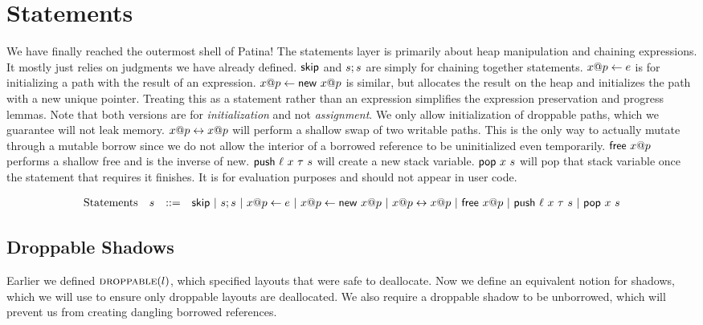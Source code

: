 \section*{Statements}
We have finally reached the outermost shell of Patina!
The statements layer is primarily about heap manipulation and chaining expressions.
It mostly just relies on judgments we have already defined.
$\mathsf{skip}$ and ${s};{s}$ are simply for chaining together statements.
${{x}@{p}} \leftarrow {e}$ is for initializing a path with the result of an expression.
${{x}@{p}} \leftarrow \textsf{new}\ {{x}@{p}}$ is similar, but allocates the result on the heap 
and initializes the path with a new unique pointer. 
Treating this as a statement rather than an expression
simplifies the expression preservation and progress lemmas.
Note that both versions are for \emph{initialization} and not \emph{assignment}.
We only allow initialization of droppable paths, which we guarantee will not leak memory.
${{x}@{p}} \leftrightarrow {{x}@{p}}$ will perform a shallow swap of two writable paths.
This is the only way to actually mutate through a mutable borrow since we do not allow
the interior of a borrowed reference to be uninitialized even temporarily.
$\textsf{free}\ {{x}@{p}}$ performs a shallow free and is the inverse of \textsf{new}.
$\textsf{push}\ {\ell}\ {x}\ {\tau}\ {s}$ will create a new stack variable.
$\textsf{pop}\ {x}\ {s}$ will pop that stack variable once the statement that requires it finishes.
It is for evaluation purposes and should not appear in user code.

\[
\begin{array}{lccl}
\textrm{Statements} & s & ::= & \mathsf{skip} ~|~ {s};{s} ~|~ {{x}@{p}} \leftarrow {e}
			  ~|~ {{x}@{p}} \leftarrow \textsf{new}\ {{x}@{p}} ~|~ {{x}@{p}} \leftrightarrow {{x}@{p}}
			  ~|~ \textsf{free}\ {{x}@{p}} ~|~ \textsf{push}\ {\ell}\ {x}\ {\tau}\ {s}
			  ~|~ \textsf{pop}\ {x}\ {s}
\end{array}
\]

\subsection*{Droppable Shadows}
Earlier we defined $\textsc{droppable}(l)$, which specified layouts that were safe to deallocate.
Now we define an equivalent notion for shadows, which we will use to ensure only droppable
layouts are deallocated. We also require a droppable shadow to be unborrowed, which will
prevent us from creating dangling borrowed references.
\newline


